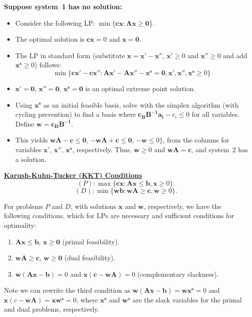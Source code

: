 \vspace{3mm} {\bf Suppose system~1 has no solution:}
\begin{itemize}
\item Consider the following LP: $\min\{\mathbf{cx}: \mathbf{Ax} \ge \mathbf{0}$\}.
\item The optimal solution is $\mathbf{cx}=0$ and $\mathbf{x}=\mathbf{0}$.
\item The LP in standard form (substitute $\mathbf{x} = \mathbf{x'}-\mathbf{x''}$,  $\mathbf{x'} \ge 0$ and $\mathbf{x''} \ge 0$ and add $\mathbf{x^s} \ge 0$) follows: \vspace{-3mm}
$$\min\{\mathbf{cx' - cx''}: \mathbf{Ax'-Ax''-x^s} = \mathbf{0}, \mathbf{x'}, \mathbf{x''}, \mathbf{x^s} \ge 0 \}$$ 
\item \vspace{-3mm} $\mathbf{x'}=\mathbf{0}$, $\mathbf{x''}=\mathbf{0}$, $\mathbf{x^s}=\mathbf{0}$ is an optimal extreme point solution.
\item Using $\mathbf{x^s}$ as an initial feasible basis, solve with the simplex algorithm (with cycling prevention) to find a basis where $\mathbf{c_BB^{-1}a_i}-c_i \le 0$ for all variables. Define $\mathbf{w}=\mathbf{c_BB^{-1}}$. 
\item This yields $\mathbf{wA}-\mathbf{c} \le \mathbf{0}$, $-\mathbf{wA}+\mathbf{c} \le \mathbf{0}$, $-\mathbf{w} \le 0 \}$, from the columns for variables  $\mathbf{x'}$, $\mathbf{x''}$, $\mathbf{x^s}$, respectively.  Thus, $\mathbf{w} \ge 0$ and $\mathbf{wA} = \mathbf{c}$, and system~2 has a solution.
\end{itemize}


\vspace{6mm}\underline{\bf Karush-Kuhn-Tucker (KKT) Conditions} \\
$$(P):\max\{\mathbf{cx}: \mathbf{Ax} \le \mathbf{b}, \mathbf{x} \ge 0\}.$$ 
$$(D):\min\{\mathbf{wb}: \mathbf{wA} \ge \mathbf{c}, \mathbf{w} \ge 0\}.$$

\vspace{3mm} For problems $P$ and $D$, with solutions $\mathbf{x}$ and $\mathbf{w}$, respectively, we have the following conditions, which for LPs are necessary and sufficient conditions for optimality:
\begin{enumerate}
\item $\mathbf{Ax} \le \mathbf{b}$,  $\mathbf{x} \ge \mathbf{0}$ (primal feasibility).
\item $\mathbf{wA} \ge \mathbf{c}$, $\mathbf{w} \ge \mathbf{0}$  (dual feasibility).
\item $\mathbf{w}(\mathbf{Ax}-\mathbf{b}) = 0$ and $\mathbf{x}(\mathbf{c}- \mathbf{wA}) = 0$ (complementary slackness).
\end{enumerate}
Note we can rewrite the third condition as $\mathbf{w}(\mathbf{Ax}-\mathbf{b}) = \mathbf{w}\mathbf{x^s} = 0$ and $\mathbf{x}(c- \mathbf{wA}) = \mathbf{x}\mathbf{w^s} = 0$, where $\mathbf{x^s}$ and $\mathbf{w^s}$ are the slack variables for the primal and dual problems, respectively. \\

